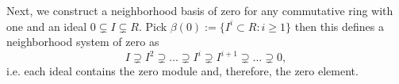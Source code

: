 \indent Next, we construct a neighborhood basis of zero for any commutative ring with one and an ideal $0 \subsetneq I \subsetneq R$. Pick $\beta(0) := \{I^i \subset R : i \geq 1\}$ then this defines a neighborhood system of zero as
$$I \supsetneq I^2 \supsetneq \ldots \supsetneq I^i \supsetneq I^{i+1} \supsetneq \ldots \supsetneq 0,$$
i.e. each ideal contains the zero module and, therefore, the zero element. 